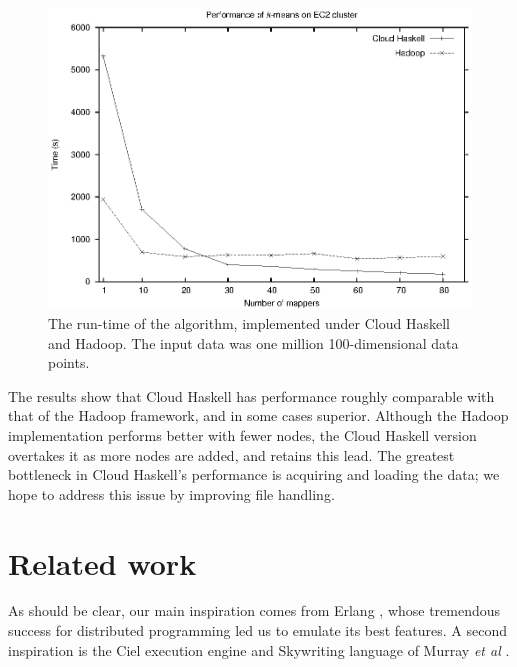 \documentclass{sigplanconf}
\begin{document}
\begin{figure}[t]
\centerline {
 \includegraphics[width=\columnwidth]{ec2.eps}
}
\vspace{0.5ex}
\caption{ 
\label{fig:performance1}
The run-time of the \kmeans{} algorithm, implemented under Cloud Haskell and Hadoop. The input data was one million 100-dimensional data points.
}
\end{figure}


The results show that Cloud Haskell has performance roughly comparable with that of the
Hadoop framework, and in some cases superior. Although the Hadoop implementation
performs better with fewer nodes, the Cloud Haskell version overtakes it as more nodes are
added, and retains this lead. The greatest bottleneck in Cloud Haskell's performance is
acquiring and loading the data; we hope to address this issue by improving file handling.



\section{Related work} \label{s:related}

As should be clear, our main inspiration comes from Erlang \cite{Erlang93}, whose tremendous
success for distributed programming led us to emulate its best features.
A second inspiration is the Ciel execution engine and Skywriting language
of Murray \emph{et al} \cite{Murray2010, Murray2011}.
\end{document}
